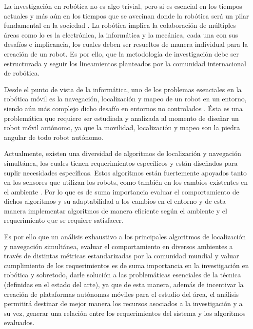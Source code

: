 La investigación en robótica no es algo trivial, pero si es esencial en los tiempos actuales y más aún en los tiempos que se avecinan donde la robótica será un pilar fundamental en la sociedad \cite{rivera_taiba_efectos_2019}. La robótica implica la colaboración de múltiples áreas como lo es la electrónica, la informática y la mecánica, cada una con sus desafíos e implicancia, los cuales deben ser resueltos de manera individual para la creación de un robot. Es por ello, que la metodología de investigación debe ser estructurada y seguir los lineamientos planteados por la comunidad internacional de robótica.

Desde el punto de vista de la informática, uno de los problemas esenciales en la robótica móvil es la navegación, localización y mapeo de un robot en un entorno, siendo aún más complejo dicho desafío en entornos no controlados \cite{fahimi_autonomous_2009}. Ésta es una problemática que requiere ser estudiada y analizada al momento de diseñar un robot móvil autónomo, ya que la movilidad, localización y mapeo son la piedra angular de todo robot autónomo. 

Actualmente, existen una diversidad de algoritmos de localización y navegación simultánea, los cuales tienen requerimientos específicos y están diseñados para suplir necesidades específicas. Estos algoritmos están fuertemente apoyados tanto en los sensores que utilizan los robots, como también en los cambios existentes en el ambiente \cite{omara_indoor_2015}. Por lo que es de suma importancia evaluar el comportamiento de dichos algoritmos y su adaptabilidad a los cambios en el entorno y de esta manera implementar algoritmos de manera eficiente según el ambiente y el requerimiento que se requiere satisfacer.

Es por ello que un análisis exhaustivo a los principales algoritmos de localización y navegación simultánea, evaluar el comportamiento en diversos ambientes a través de distintas métricas estandarizadas por la comunidad mundial y valuar cumplimiento de los requerimientos es de suma importancia en la investigación en robótica \cite{anis_koubaa_robot_2016} y sobretodo, darle solución a las problemáticas esenciales de la técnica (definidas en el estado del arte), ya que de esta manera, además de incentivar la creación de plataformas autónomas móviles para el estudio del área, el análisis permitirá destinar de mejor manera los recursos asociados a la investigación y a su vez, generar una relación entre los requerimientos del sistema y los algoritmos evaluados.


